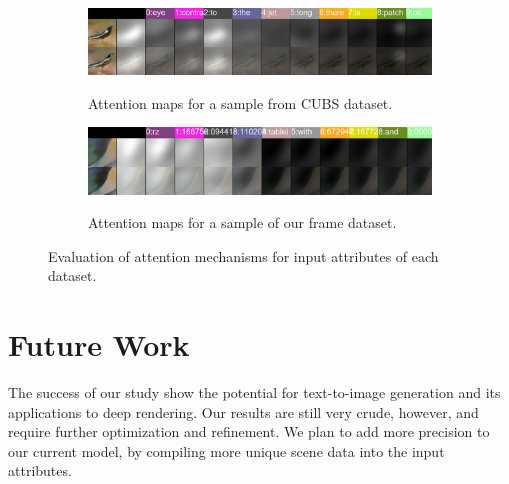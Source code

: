\documentclass[letterpaper]{article} %
\begin{document}
\begin{figure}[h!]
\centering
\begin{subfigure}{0.5\textwidth}
\begin{center}
\begin{minipage}[t]{0.95\linewidth}
\begin{centering}
{\includegraphics[width=\linewidth]{maps_birds.png}}
\caption{Attention maps for a sample from CUBS dataset.}
\label{fig:maps_birds}
\end{centering}
\end{minipage}
\end{center}
\end{subfigure}
\par\medskip
\begin{subfigure}{0.5\textwidth}
\begin{center}
\begin{minipage}[t]{0.95\linewidth}
\begin{centering}
{\includegraphics[width=\linewidth]{maps_frame.png}}
\caption{Attention maps for a sample of our frame dataset.}
\label{fig:maps_frame}
\end{centering}
\end{minipage}
\end{center}
\end{subfigure}
\caption{Evaluation of attention mechanisms for input attributes of each 
dataset.}
\label{fig:maps}
\end{figure}

\section{Future Work}
The success of our study show the potential for text-to-image generation and 
its applications to deep rendering. Our results are still very crude, however, 
and require further optimization and refinement. We plan to add more precision 
to our current model, by compiling more unique scene data into the input 
attributes.
\end{document}
